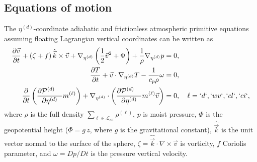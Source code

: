 \documentclass{agujournal}
\begin{document}

%
\subsection{Equations of motion}
The $\eta^{(d)}$-coordinate adiabatic and frictionless atmospheric primitive equations assuming floating Lagrangian vertical coordinates \citep{S1945JAS,L2004MWR} can be written as
\begin{align}
\frac{\partial \vec{v}}{\partial t} + \left( \zeta + f \right) {\hat{\vec{k}}} \times \vec{v}  + \nabla_{\eta^{(d)}} \left( \frac12 \vec{v}^2 + \Phi \right)  + \frac{1}{\rho} \nabla_{\eta^{(d)}} p &= 0,\label{E:PEmom} \\
\frac{\partial T}{\partial t} + \vec{v} \cdot \nabla_{\eta^{(d)}} T  -  \frac{1}{c_p \rho} \omega  &= 0, \label{E:PEtemp} \\
\frac{\partial}{\partial t} \left( \frac{\partial \mathcal{P}^{(d)}\quad }{\partial \eta^{(d)}} m^{(\ell)} \right) +  \nabla_{\eta^{(d)}}\cdot   \left( \frac{\partial \mathcal{P}^{(d)}\quad }{\partial \eta^{(d)}} m^{(\ell)} \vec{v} \right)  &= 0, \quad \ell=`d`,`wv`,`cl`,`ci`, \label{E:PEq}
\end{align}
where $\rho$ is the full density $\sum_{\ell \in \mathcal{L}_{all}} \rho^{(\ell)}$, $p$ is moist pressure, $\Phi$ is the geopotential height ($\Phi=g\, z$, where $g$ is the gravitational constant), ${\hat{\vec{k}}}$ is the unit vector normal to the surface of the sphere, $\zeta = {\hat{\vec{k}}} \cdot {\nabla \times} \vec{v}$ is vorticity, $f$ Coriolis parameter, and $\omega = Dp/Dt$ is the pressure vertical velocity. 
\end{document}
